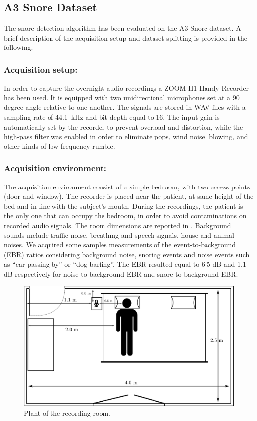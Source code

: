 \subsection{A3 Snore Dataset} 

The snore detection algorithm has been evaluated on the A3-Snore dataset. A brief description of the acquisition setup and dataset splitting is provided in the following.

\subsubsection{Acquisition setup:}
In order to capture the overnight audio recordings a ZOOM-H1 Handy Recorder has been used. It is equipped with two unidirectional microphones set at a 90 degree angle relative to one another. The signals are stored in WAV files with a sampling rate of 44.1\ kHz and bit depth equal to 16.
The input gain is automatically set by the recorder to prevent overload and distortion, while the high-pass filter was enabled in order to eliminate pops, wind noise, blowing, and other kinds of low frequency rumble.


\subsubsection{Acquisition environment:}
The acquisition environment consist of a simple bedroom, with two access points (door and window). The recorder is placed near the patient, at same height of the bed and in line with the subject's mouth. During the recordings, the patient is the only one that can occupy the bedroom, in order to avoid contaminations on recorded audio signals. The room dimensions are reported in .
Background sounds include traffic noise, breathing and speech signals, house and animal noises. We acquired some samples measurements of the event-to-background (EBR) ratios considering background noise, snoring events and noise events such as ``car passing by'' or ``dog barfing''. The EBR resulted equal to 6.5 dB and 1.1 dB respectively for noise to background EBR and snore to background EBR. 


\begin{figure}[t]
	\centering
	\includegraphics[width=0.6\columnwidth]{img/room.pdf}
	\caption[Recording Room]{Plant of the recording room.} 
	\label{fig:room}
\end{figure}



